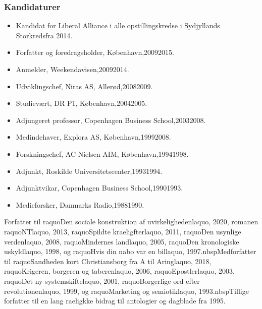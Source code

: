 \documentclass[11pt, a4paper]{awesome-cv}
\begin{document}
\begin{cvletter}
\subsubsection*{Kandidaturer}
\begin{itemize}
\item Kandidat for Liberal Alliance i alle opstillingskredse i Sydjyllands Storkredsfra 2014.
\end{itemize}
\begin{itemize}
\item Forfatter og foredragsholder, København,20092015.
\item Anmelder, Weekendavisen,20092014.
\item Udviklingschef, Niras AS, Allerød,20082009.
\item Studievært, DR P1, København,20042005.
\item Adjungeret professor, Copenhagen Business School,20032008.
\item Medindehaver, Explora AS, København,19992008.
\item Forskningschef, AC Nielsen AIM, København,19941998.
\item Adjunkt, Roskilde Universitetscenter,19931994.
\item Adjunktvikar, Copenhagen Business School,19901993.
\item Medieforsker, Danmarks Radio,19881990.
\end{itemize}
Forfatter til raquoDen sociale konstruktion af uvirkelighedenlaquo, 2020, romanen raquoNTlaquo, 2013, raquoSpildte kraeligfterlaquo, 2011, raquoDen usynlige verdenlaquo, 2008, raquoMindernes landlaquo, 2005, raquoDen kronologiske uskyldlaquo, 1998, og raquoHvis din nabo var en billaquo, 1997.nbspMedforfatter til raquoSandheden kort  Christiansborg fra A til Aringlaquo, 2018, raquoKrigeren, borgeren og taberenlaquo, 2006, raquoEpostlerlaquo, 2003, raquoDet ny systemskiftelaquo, 2001, raquoBorgerlige ord efter revolutionenlaquo, 1999, og raquoMarketing og semiotiklaquo, 1993.nbspTillige forfatter til en lang raeligkke bidrag til antologier og dagblade fra 1995.

\end{cvletter}
\end{document}
